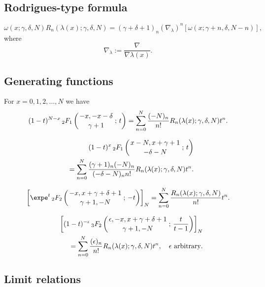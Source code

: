 \documentclass[envcountchap,graybox]{svmono}
\newcommand{\hyp}[5]{\mbox{}_{#1}{F}_{#2}
\left(\genfrac{}{}{0pt}{}{#3}{#4}\,;\,#5\right)}
\newcommand{\hyp}[5]{\,\mbox{}_{#1}F_{#2}\!\left(
  \genfrac{}{}{0pt}{}{#3}{#4};#5\right)}
\begin{document}
\newpage

\subsection*{Rodrigues-type formula}
\begin{equation}
\label{RodDualHahn}
\omega(x;\gamma,\delta,N)R_n(\lambda(x);\gamma,\delta,N)
=(\gamma+\delta+1)_n\left(\nabla_{\lambda}\right)^n\left[\omega(x;\gamma+n,\delta,N-n)\right],
\end{equation}
where
$$\nabla_{\lambda}:=\frac{\nabla}{\nabla\lambda(x)}.$$

\subsection*{Generating functions}
For $x=0,1,2,\ldots,N$ we have
\begin{equation}
\label{GenDualHahn1}
(1-t)^{N-x}\,\hyp{2}{1}{-x,-x-\delta}{\gamma+1}{t}
=\sum_{n=0}^N\frac{(-N)_n}{n!}R_n(\lambda(x);\gamma,\delta,N)t^n.
\end{equation}

\begin{eqnarray}
\label{GenDualHahn2}
& &(1-t)^x\,\hyp{2}{1}{x-N,x+\gamma+1}{-\delta-N}{t}\nonumber\\
& &=\sum_{n=0}^N\frac{(\gamma+1)_n(-N)_n}{(-\delta-N)_nn!}R_n(\lambda(x);\gamma,\delta,N)t^n.
\end{eqnarray}

\begin{equation}
\label{GenDualHahn3}
\left[\expe^t\,\hyp{2}{2}{-x,x+\gamma+\delta+1}{\gamma+1,-N}{-t}\right]_N=\sum_{n=0}^N
\frac{R_n(\lambda(x);\gamma,\delta,N)}{n!}t^n.
\end{equation}

\begin{eqnarray}
\label{GenDualHahn4}
& &\left[(1-t)^{-\epsilon}\,\hyp{3}{2}{\epsilon,-x,x+\gamma+\delta+1}{\gamma+1,-N}{\frac{t}{t-1}}\right]_N\nonumber\\
& &{}=\sum_{n=0}^N\frac{(\epsilon)_n}{n!}R_n(\lambda(x);\gamma,\delta,N)t^n,
\quad\textrm{$\epsilon$ arbitrary}.
\end{eqnarray}

\subsection*{Limit relations}
\end{document}
